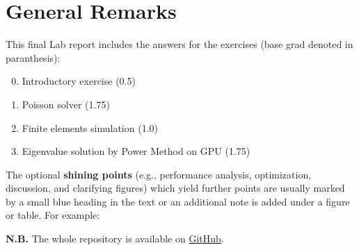 \section*{General Remarks}
This final Lab report includes the answers for the exercises (base grad denoted in paranthesis):
\begin{enumerate}
    \setcounter{enumi}{-1}
    \item Introductory exercise (0.5)
    \item Poisson solver (1.75)
    \item Finite elements simulation (1.0)
    \item Eigenvalue solution by Power Method on GPU (1.75)
\end{enumerate}
The optional \textbf{shining points} (e.g., performance analysis, optimization, discussion, and
clarifying figures) which yield further points are usually marked by a small blue heading in the text or an additional note is added under a figure or table. For example:\\ 

\textbf{N.B.} The whole repository is available on \href{https://github.com/etschgi1/HPC}{GitHub}.